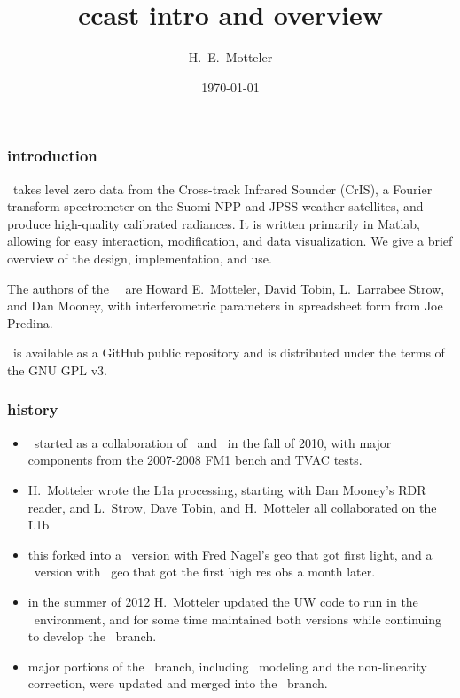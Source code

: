 \documentclass[11pt]{beamer}
\title{ccast intro and overview}
\author{H.~E.~Motteler}
\institute{
  UMBC Atmospheric Spectroscopy Lab \\
  Joint Center for Earth Systems Technology \\
}
\date{\today}
\begin{document}
\begin{frame}[plain]
\titlepage
\end{frame}
\begin{frame}
\frametitle{introduction}

\ccast\ takes level zero data from the Cross-track Infrared Sounder
(CrIS), a Fourier transform spectrometer on the Suomi NPP and JPSS
weather satellites, and produce high-quality calibrated radiances.
It is written primarily in Matlab, allowing for easy interaction,
modification, and data visualization.  We give a brief overview of
the design, implementation, and use.

\hspace{2cm}

The authors of the \umbc\ \ccast\ are Howard E.~Motteler, David Tobin,
L.~Larrabee Strow, and Dan Mooney, with interferometric parameters
in spreadsheet form from Joe Predina.

\hspace{2cm}

\ccast\ is available as a GitHub public repository and is distributed
under the terms of the GNU GPL v3.

\end{frame}
\begin{frame}
\frametitle{history}

\begin{itemize}
  \item \ccast\ started as a collaboration of \umbc\ and \uw\ in the
    fall of 2010, with major components from the 2007-2008 FM1 bench
    and TVAC tests.

  \item H.~Motteler wrote the L1a processing, starting with Dan
    Mooney's RDR reader, and L.~Strow, Dave Tobin, and H.~Motteler
    all collaborated on the L1b 

  \item this forked into a \uw\ version with Fred Nagel's geo that
    got first light, and a \umbc\ version with \noaa\ geo that got
    the first high res obs a month later.

  \item in the summer of 2012 H.~Motteler updated the UW code to 
    run in the \umbc\ environment, and for some time maintained both
    versions while continuing to develop the \umbc\ branch.

  \item major portions of the \uw\ branch, including \ict\ modeling
    and the non-linearity correction, were updated and merged into
    the \umbc\ branch.
\end{itemize}


\end{frame}
\end{document}
